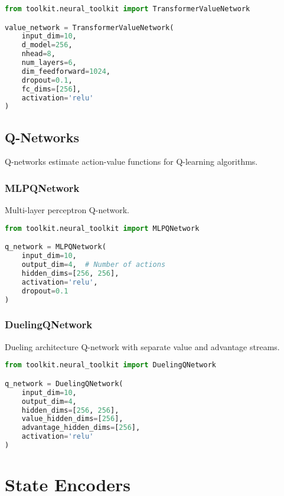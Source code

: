 \begin{lstlisting}[language=python, caption=Transformer Value Network]
from toolkit.neural_toolkit import TransformerValueNetwork

value_network = TransformerValueNetwork(
    input_dim=10,
    d_model=256,
    nhead=8,
    num_layers=6,
    dim_feedforward=1024,
    dropout=0.1,
    fc_dims=[256],
    activation='relu'
)
\end{lstlisting}

\subsection{Q-Networks}

Q-networks estimate action-value functions for Q-learning algorithms.

\subsubsection{MLPQNetwork}

Multi-layer perceptron Q-network.

\begin{lstlisting}[language=python, caption=MLP Q-Network]
from toolkit.neural_toolkit import MLPQNetwork

q_network = MLPQNetwork(
    input_dim=10,
    output_dim=4,  # Number of actions
    hidden_dims=[256, 256],
    activation='relu',
    dropout=0.1
)
\end{lstlisting}

\subsubsection{DuelingQNetwork}

Dueling architecture Q-network with separate value and advantage streams.

\begin{lstlisting}[language=python, caption=Dueling Q-Network]
from toolkit.neural_toolkit import DuelingQNetwork

q_network = DuelingQNetwork(
    input_dim=10,
    output_dim=4,
    hidden_dims=[256, 256],
    value_hidden_dims=[256],
    advantage_hidden_dims=[256],
    activation='relu'
)
\end{lstlisting}

\section{State Encoders}

